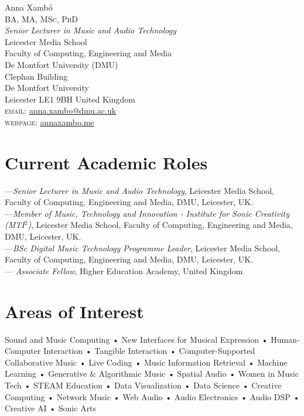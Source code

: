 \documentclass[10pt, a4paper]{article}
\begin{document}
{\Huge Anna Xambó}\\[0.1cm]
\textsc{BA, MA, MSc, PhD}\\[0.9cm]
\emph{Senior Lecturer in Music and Audio Technology}\\
Leicester Media School\\
Faculty of Computing, Engineering and Media\\
De Montfort University (DMU)\\
Clephan Building \\
De Montfort University\\
Leicester LE1 9BH United Kingdom\\[.2cm]
\textsc{email}: \href{mailto:anna.xambo@dmu.ac.uk}{anna.xambo@dmu.ac.uk}\\
\textsc{webpage}: \href{http://annaxambo.me/}{annaxambo.me}

\section*{Current Academic Roles}
---\emph{Senior Lecturer in Music and Audio Technology}, Leicester Media School, Faculty of Computing, Engineering and Media, DMU, Leicester, UK.\\
---\emph{Member of Music, Technology and Innovation - Institute for Sonic Creativity (MTI${^2}$)}, Leicester Media School, Faculty of Computing, Engineering and Media, DMU, Leicester, UK.\\
---\emph{BSc Digital Music Technology Programme Leader}, Leicester Media School, Faculty of Computing, Engineering and Media, DMU, Leicester, UK.\\
---\emph{ Associate Fellow}, Higher Education Academy, United Kingdom
\section*{Areas of Interest}
Sound and Music Computing • New Interfaces for Musical Expression • Human-Computer Interaction • Tangible Interaction • Computer-Supported Collaborative Music • Live Coding • Music Information Retrieval • Machine Learning • Generative \& Algorithmic Music • Spatial Audio • Women in Music Tech • STEAM Education • Data Visualization • Data Science • Creative Computing • Network Music • Web Audio • Audio Electronics • Audio DSP • Creative AI • Sonic Arts
\end{document}
